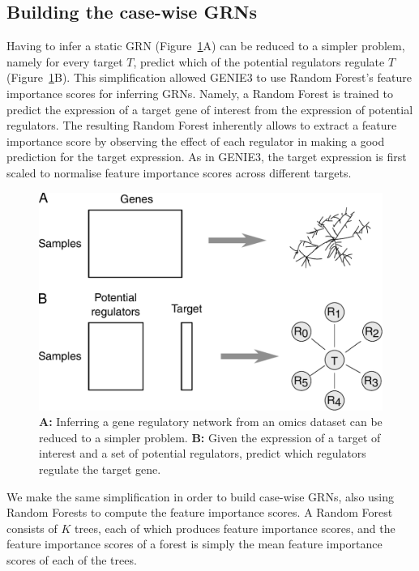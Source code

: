 \subsection{Building the case-wise GRNs}
Having to infer a static GRN (Figure~\ref{fig:simplify}A) can be reduced to a simpler problem, namely for every target $T$, predict which of the potential regulators regulate $T$ (Figure~\ref{fig:simplify}B). This simplification allowed GENIE3\cite{huynh-thu_inferringregulatorynetworks_2010} to use Random Forest's\cite{breiman_randomforests_2001} feature importance scores for inferring GRNs. Namely, a Random Forest is trained to predict the expression of a target gene of interest from the expression of potential regulators. The resulting Random Forest inherently allows to extract a feature importance score by observing the effect of each regulator in making a good prediction for the target expression. As in GENIE3, the target expression is first scaled to normalise feature importance scores across different targets.

\begin{figure}[htb!]
	\centering
	\includegraphics[width=.6\linewidth]{fig/methodology/simplify.pdf} 
	\caption{
		\textbf{A:} Inferring a gene regulatory network from an omics dataset can be reduced to a simpler problem. 
		\textbf{B:} Given the expression of a target of interest and a set of potential regulators, predict which regulators regulate the target gene.
	}
	\label{fig:simplify}
\end{figure}

We make the same simplification in order to build case-wise GRNs, also using Random Forests to compute the feature importance scores. A Random Forest consists of $K$ trees, each of which produces feature importance scores, and the feature importance scores of a forest is simply the mean feature importance scores of each of the trees. 

